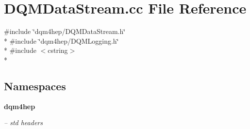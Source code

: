 \section{D\+Q\+M\+Data\+Stream.\+cc File Reference}
\label{DQMDataStream_8cc}
{\ttfamily \#include \char`\"{}dqm4hep/\+D\+Q\+M\+Data\+Stream.\+h\char`\"{}}\\*
{\ttfamily \#include \char`\"{}dqm4hep/\+D\+Q\+M\+Logging.\+h\char`\"{}}\\*
{\ttfamily \#include $<$cstring$>$}\\*
\subsection*{Namespaces}
\begin{DoxyCompactItemize}
\item 
 {\bf dqm4hep}
\begin{DoxyCompactList}\small\item\em -- std headers \end{DoxyCompactList}\end{DoxyCompactItemize}
